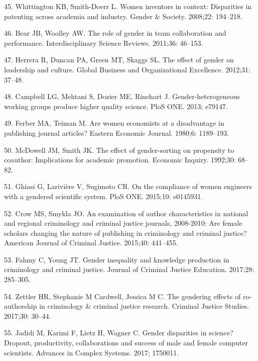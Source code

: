 \documentclass[12pt,]{article}
\begin{document}
\hypertarget{ref-Whittington_2008}{}
45. Whittington KB, Smith-Doerr L. Women inventors in context:
Disparities in patenting across academia and industry. Gender \&
Society. 2008;22: 194--218.

\hypertarget{ref-Bear_2011}{}
46. Bear JB, Woolley AW. The role of gender in team collaboration and
performance. Interdisciplinary Science Reviews. 2011;36: 46--153.

\hypertarget{ref-Herrera_2012}{}
47. Herrera R, Duncan PA, Green MT, Skaggs SL. The effect of gender on
leadership and culture. Global Business and Organizational Excellence.
2012;31: 37--48.

\hypertarget{ref-Campbell_2013}{}
48. Campbell LG, Mehtani S, Dozier ME, Rinehart J. Gender-heterogeneous
working groups produce higher quality science. PloS ONE. 2013; e79147.

\hypertarget{ref-Ferber_1980}{}
49. Ferber MA, Teiman M. Are women economists at a disadvantage in
publishing journal articles? Eastern Economic Journal. 1980;6:
1189--193.

\hypertarget{ref-McDowell_1992}{}
50. McDowell JM, Smith JK. The effect of gender-sorting on propensity to
coauthor: Implications for academic promotion. Economic Inquiry.
1992;30: 68--82.

\hypertarget{ref-Ghiasi_2015}{}
51. Ghiasi G, Larivière V, Sugimoto CR. On the compliance of women
engineers with a gendered scientific system. PloS ONE. 2015;10:
e0145931.

\hypertarget{ref-Crow_2015}{}
52. Crow MS, Smykla JO. An examination of author characteristics in
national and regional criminology and criminal justice journals,
2008-2010: Are female scholars changing the nature of publishing in
criminology and criminal justice? American Journal of Criminal Justice.
2015;40: 441--455.

\hypertarget{ref-Fahmy_2017}{}
53. Fahmy C, Young JT. Gender inequality and knowledge production in
criminology and criminal justice. Journal of Criminal Justice Education.
2017;28: 285--305.

\hypertarget{ref-Zettler_2017}{}
54. Zettler HR, Stephanie M Cardwell, Jessica M C. The gendering effects
of co-authorship in criminology \& criminal justice research. Criminal
Justice Studies. 2017;30: 30--44.

\hypertarget{ref-Jadidi_2017}{}
55. Jadidi M, Karimi F, Lietz H, Wagner C. Gender disparities in
science? Dropout, productivity, collaborations and success of male and
female computer scientists. Advances in Complex Systems. 2017; 1750011.
\end{document}
